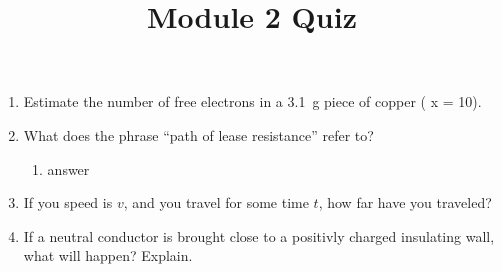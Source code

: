 \documentclass[letterpaper,10pt]{article}
\title{Module 2 Quiz}
\begin{document}
\maketitle

\begin{enumerate}
    \item Estimate the number of free electrons in a \SI{3.1}{\gram} piece of copper ( x = 10).
    \item What does the phrase ``path of lease resistance'' refer to?
    \begin{enumerate}
        \item answer
    \end{enumerate}
    \item If you speed is $v$, and you travel for some time $t$, how far have you traveled?
    \item If a neutral conductor is brought close to a positivly charged insulating wall, what will happen? Explain.
    \vspace{2in}
\end{enumerate}
\end{document}
